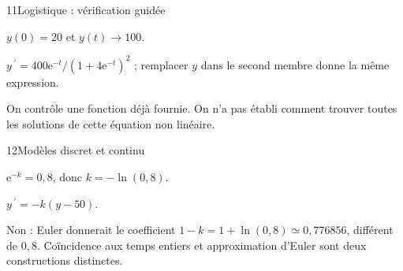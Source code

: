 \begin{corrige}{11}{Logistique : vérification guidée}
\begin{questions}
\item $y(0)=20$ et $y(t)\to100$.
\item $y\,\!^{\prime}=400\mathrm e^{-t}/(1+4\mathrm e^{-t})^2$ ; remplacer $y$ dans le second membre donne la même expression.
\item On contrôle une fonction déjà fournie. On n’a pas établi comment trouver toutes les solutions de cette équation non linéaire.
\end{questions}
\end{corrige}
\begin{corrige}{12}{Modèles discret et continu}
\begin{questions}
\item $\mathrm e^{-k}=0{,}8$, donc $k=-\ln(0{,}8)$.
\item $y\,\!^{\prime}=-k(y-50)$.
\item Non : Euler donnerait le coefficient $1-k=1+\ln(0{,}8)\simeq0{,}776856$, différent de $0{,}8$. Coïncidence aux temps entiers et approximation d’Euler sont deux constructions distinctes.
\end{questions}
\end{corrige}
